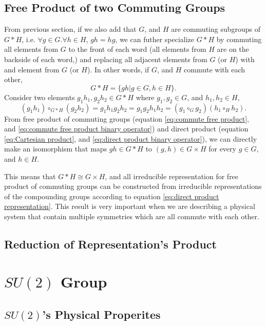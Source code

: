 \documentclass[preprint, 12pt]{revtex4-2}
\numberwithin{equation}{section}
\begin{document}
\subsection{Free Product of two Commuting Groups}
From previous section, if we also add that $G$, and $H$ are commuting subgroups of $G\ast H$, i.e. $\forall g\in G.\forall h\in H$, $gh=hg$, we can  futher specialize $G\ast H$ by commuting all elements from $G$ to the front of each word (all elements from $H$ are on the backside of each word,) and replacing all adjacent elements from $G$ (or $H$) with and element from $G$ (or $H$). In other words, if $G$, and $H$ commute with each other,
\begin{equation}\label{eq:commute free product}
    G\ast H = \{gh|g\in G, h\in H\}.
\end{equation}
Consider two elements $g_1h_1, g_2h_2\in G\ast H$ where $g_1, g_2\in G$, and $h_1, h_2\in H$,
\begin{equation}\label{eq:commute free product binary operator}
    (g_1h_1)\circ_{G\ast H} (g_2h_2) = g_1h_1g_2h_2=g_1g_2h_1h_2=(g_1\circ_Gg_2)(h_1\circ_Hh_2).
\end{equation}
From free product of commuting groups (equation \ref{eq:commute free product}, and \ref{eq:commute free product binary operator}) and direct product (equation \ref{eq:Cartesian product}, and \ref{eq:direct product binary operator}), we can directly make an isomorphism that maps $gh\in G\ast H$ to $(g,h)\in G\times H$ for every $g\in G$, and $h\in H$. 

This means that $G\ast H\cong G\times H$, and all irreducible representation for free product of commuting groups can be constructed from irreducible representations of the compounding groups according to equation \ref{eq:direct product representation}. This result is very important when we are describing a physical system that contain multiple symmetries which are all commute with each other.

\subsection{Reduction of Representation's Product}

\newpage
\section{$SU(2)$ Group}

\subsection{$SU(2)$'s Physical Properites}
\end{document}
